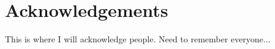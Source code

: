 \documentclass[twoside,symmetric,nobib]{./arm-thesis}
\newcommand{\blankpage}{\newpage\hbox{}\thispagestyle{empty}\newpage}
\begin{document}
\blankpage

\newpage
\begin{fullwidth}
\thispagestyle{empty}
\setlength{\parindent}{0pt}
\setlength{\parskip}{\baselineskip}
~\vfill
\chapter*{Acknowledgements}

This is where I will acknowledge people.
Need to remember everyone...

~\vfill
\end{fullwidth}

\tableofcontents

\listoffigures

\listoftables

\lstlistoflistings
\end{document}

